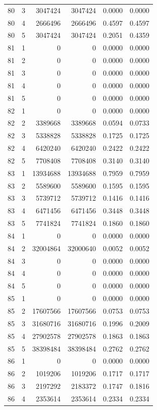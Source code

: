 \begin{longtable}{rrrrrr}
80 & 3 & 3047424 & 3047424 & 0.0000 & 0.0000 \\
80 & 4 & 2666496 & 2666496 & 0.4597 & 0.4597 \\
80 & 5 & 3047424 & 3047424 & 0.2051 & 0.4359 \\
81 & 1 & 0 & 0 & 0.0000 & 0.0000 \\
81 & 2 & 0 & 0 & 0.0000 & 0.0000 \\
81 & 3 & 0 & 0 & 0.0000 & 0.0000 \\
81 & 4 & 0 & 0 & 0.0000 & 0.0000 \\
81 & 5 & 0 & 0 & 0.0000 & 0.0000 \\
82 & 1 & 0 & 0 & 0.0000 & 0.0000 \\
82 & 2 & 3389668 & 3389668 & 0.0594 & 0.0733 \\
82 & 3 & 5338828 & 5338828 & 0.1725 & 0.1725 \\
82 & 4 & 6420240 & 6420240 & 0.2422 & 0.2422 \\
82 & 5 & 7708408 & 7708408 & 0.3140 & 0.3140 \\
83 & 1 & 13934688 & 13934688 & 0.7959 & 0.7959 \\
83 & 2 & 5589600 & 5589600 & 0.1595 & 0.1595 \\
83 & 3 & 5739712 & 5739712 & 0.1416 & 0.1416 \\
83 & 4 & 6471456 & 6471456 & 0.3448 & 0.3448 \\
83 & 5 & 7741824 & 7741824 & 0.1860 & 0.1860 \\
84 & 1 & 0 & 0 & 0.0000 & 0.0000 \\
84 & 2 & 32004864 & 32000640 & 0.0052 & 0.0052 \\
84 & 3 & 0 & 0 & 0.0000 & 0.0000 \\
84 & 4 & 0 & 0 & 0.0000 & 0.0000 \\
84 & 5 & 0 & 0 & 0.0000 & 0.0000 \\
85 & 1 & 0 & 0 & 0.0000 & 0.0000 \\
85 & 2 & 17607566 & 17607566 & 0.0753 & 0.0753 \\
85 & 3 & 31680716 & 31680716 & 0.1996 & 0.2009 \\
85 & 4 & 27902578 & 27902578 & 0.1863 & 0.1863 \\
85 & 5 & 38398484 & 38398484 & 0.2762 & 0.2762 \\
86 & 1 & 0 & 0 & 0.0000 & 0.0000 \\
86 & 2 & 1019206 & 1019206 & 0.1717 & 0.1717 \\
86 & 3 & 2197292 & 2183372 & 0.1747 & 0.1816 \\
86 & 4 & 2353614 & 2353614 & 0.2334 & 0.2334 \\

\end{longtable}
